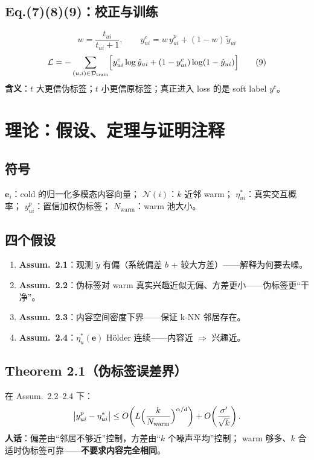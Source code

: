 \documentclass[11pt,a4paper]{ctexart}
\begin{document}
\subsection{Eq.(7)(8)(9)：校正与训练}
\[
w=\frac{t_{ui}}{t_{ui}+1},
\qquad
y^{c}_{ui}=w\,y^{p}_{ui}+(1-w)\,\tilde{y}_{ui}
\tag{7,8}
\]
\[
\mathcal{L}
=
-\sum_{(u,i)\in\mathcal{D}_{\mathrm{train}}}
\Bigl[
y^{c}_{ui}\log\hat{y}_{ui}
+(1-y^{c}_{ui})\log(1-\hat{y}_{ui})
\Bigr]
\tag{9}
\]
\textbf{含义}：$t$ 大更信伪标签；$t$ 小更信原标签；真正进入 loss 的是 soft label $y^{c}$。

\section{理论：假设、定理与证明注释}

\subsection{符号}
$\mathbf{e}_i$：cold 的归一化多模态内容向量；
$\mathcal{N}(i)$：$k$ 近邻 warm；
$\eta^*_{ui}$：真实交互概率；
$y^{p}_{ui}$：置信加权伪标签；
$N_{\mathrm{warm}}$：warm 池大小。

\subsection{四个假设}
\begin{enumerate}
  \item \textbf{Assum.\ 2.1}：观测 $\tilde{y}$ 有偏（系统偏差 $b$ + 较大方差）——解释为何要去噪。
  \item \textbf{Assum.\ 2.2}：伪标签对 warm 真实兴趣近似无偏、方差更小——伪标签更“干净”。
  \item \textbf{Assum.\ 2.3}：内容空间密度下界——保证 k-NN 邻居存在。
  \item \textbf{Assum.\ 2.4}：$\eta^*_u(\mathbf{e})$ Hölder 连续——内容近 $\Rightarrow$ 兴趣近。
\end{enumerate}

\subsection{Theorem 2.1（伪标签误差界）}
在 Assum.\ 2.2--2.4 下：
\[
\bigl|y^{p}_{ui}-\eta^*_{ui}\bigr|
\le
O\!\left(
L\Bigl(\frac{k}{N_{\mathrm{warm}}}\Bigr)^{\alpha/d}
\right)
+
O\!\left(\frac{\sigma'}{\sqrt{k}}\right).
\]
\textbf{人话}：偏差由“邻居不够近”控制，方差由“$k$ 个噪声平均”控制；
warm 够多、$k$ 合适时伪标签可靠——\textbf{不要求内容完全相同}。
\end{document}
